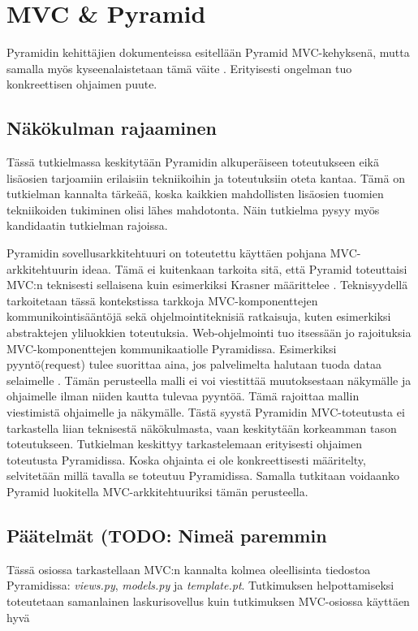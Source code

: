 \documentclass[finnish,utf8,nonumbib,palatino,kandi]{gradu2}
\begin{document}
\section{MVC \& Pyramid}
Pyramidin kehittäjien dokumenteissa esitellään Pyramid MVC-kehyksenä, mutta samalla myös kyseenalaistetaan tämä väite \cite{Pyramid:intr}. Erityisesti ongelman tuo konkreettisen ohjaimen puute.

\subsection{Näkökulman rajaaminen}
Tässä tutkielmassa keskitytään Pyramidin alkuperäiseen toteutukseen eikä lisäosien tarjoamiin erilaisiin tekniikoihin ja toteutuksiin oteta kantaa. Tämä on tutkielman kannalta tärkeää, koska kaikkien
mahdollisten lisäosien tuomien tekniikoiden tukiminen olisi lähes mahdotonta. Näin tutkielma pysyy myös kandidaatin tutkielman rajoissa.

Pyramidin sovellusarkkitehtuuri on toteutettu käyttäen pohjana MVC-arkkitehtuurin ideaa. Tämä ei kuitenkaan tarkoita sitä, että Pyramid toteuttaisi MVC:n teknisesti sellaisena kuin esimerkiksi Krasner määrittelee \cite{Krasner:desc}. Teknisyydellä
tarkoitetaan tässä kontekstissa tarkkoja MVC-komponenttejen kommunikointisääntöjä sekä ohjelmointiteknisiä ratkaisuja, kuten esimerkiksi abstraktejen yliluokkien toteutuksia. Web-ohjelmointi tuo itsessään jo rajoituksia MVC-komponenttejen kommunikaatiolle
Pyramidissa. Esimerkiksi pyyntö(request) tulee suorittaa aina, jos palvelimelta halutaan tuoda dataa selaimelle \cite{Web}. Tämän perusteella malli ei voi viestittää muutoksestaan näkymälle ja ohjaimelle ilman niiden kautta tulevaa pyyntöä. Tämä rajoittaa mallin viestimistä ohjaimelle ja näkymälle. Tästä syystä Pyramidin MVC-toteutusta ei tarkastella liian teknisestä näkökulmasta, vaan keskitytään korkeamman tason toteutukseen. 
Tutkielman keskittyy tarkastelemaan erityisesti ohjaimen toteutusta Pyramidissa. Koska ohjainta ei ole konkreettisesti määritelty, selvitetään millä tavalla se toteutuu Pyramidissa. Samalla tutkitaan voidaanko Pyramid luokitella MVC-arkkitehtuuriksi tämän perusteella. 

\subsection{Päätelmät (TODO: Nimeä paremmin}


Tässä osiossa tarkastellaan MVC:n kannalta kolmea oleellisinta tiedostoa Pyramidissa: \emph{views.py}, \emph{models.py} ja \emph{template.pt}. Tutkimuksen helpottamiseksi toteutetaan samanlainen laskurisovellus kuin tutkimuksen MVC-osiossa käyttäen
hyvä  
\end{document}
